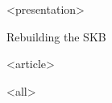 \mode
<presentation>

\begin{frame}{Rebuilding the SKB}
  \label{start:rebuild2}

  \begin{block}{Documentation -- Presentations and Notes}
    }
  \end{block}
\end{frame}


\mode
<article>

\bigskip

\mode
<all>